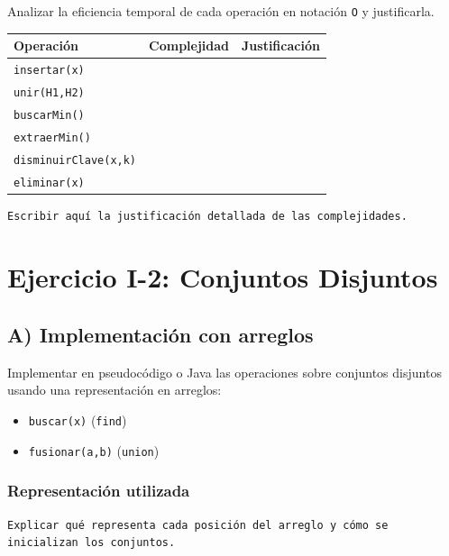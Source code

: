 \documentclass[11pt]{article}
\begin{document}
Analizar la eficiencia temporal de cada operación en notación \texttt{O} y justificarla.

\begin{center}
\begin{tabular}{lll}
Operación & Complejidad & Justificación\\[0pt]
\hline
\texttt{insertar(x)} &  & \\[0pt]
\texttt{unir(H1,H2)} &  & \\[0pt]
\texttt{buscarMin()} &  & \\[0pt]
\texttt{extraerMin()} &  & \\[0pt]
\texttt{disminuirClave(x,k)} &  & \\[0pt]
\texttt{eliminar(x)} &  & \\[0pt]
\end{tabular}
\end{center}

\begin{verbatim}
Escribir aquí la justificación detallada de las complejidades.
\end{verbatim}

\section{Ejercicio I-2: Conjuntos Disjuntos}
\label{sec:org28ae0bc}

\subsection{A) Implementación con arreglos}
\label{sec:orgf517c13}

Implementar en pseudocódigo o Java las operaciones sobre conjuntos disjuntos usando una representación en arreglos:

\begin{itemize}
\item \texttt{buscar(x)} (\texttt{find})
\item \texttt{fusionar(a,b)} (\texttt{union})
\end{itemize}

\subsubsection{Representación utilizada}
\label{sec:org5726f8e}

\begin{verbatim}
Explicar qué representa cada posición del arreglo y cómo se inicializan los conjuntos.
\end{verbatim}
\end{document}
